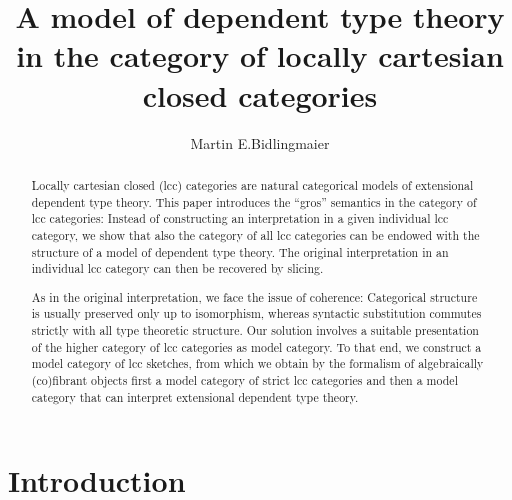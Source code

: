 \documentclass[a4paper]{article}
\theoremstyle{remark}
\theoremstyle{definition}
\begin{document}
\title{A model of dependent type theory in the category of locally cartesian closed categories}

\author{Martin E.\@ Bidlingmaier}

\maketitle

\begin{abstract}
  Locally cartesian closed (lcc) categories are natural categorical models of extensional dependent type theory.
  This paper introduces the ``gros'' semantics in the category of lcc categories:
  Instead of constructing an interpretation in a given individual lcc category, we show that also the category of all lcc categories can be endowed with the structure of a model of dependent type theory.
  The original interpretation in an individual lcc category can then be recovered by slicing.

  As in the original interpretation, we face the issue of coherence:
  Categorical structure is usually preserved only up to isomorphism, whereas syntactic substitution commutes strictly with all type theoretic structure.
  Our solution involves a suitable presentation of the higher category of lcc categories as model category.
  To that end, we construct a model category of lcc sketches, from which we obtain by the formalism of algebraically (co)fibrant objects first a model category of strict lcc categories and then a model category that can interpret extensional dependent type theory.
\end{abstract}

\section{Introduction}
\end{document}
